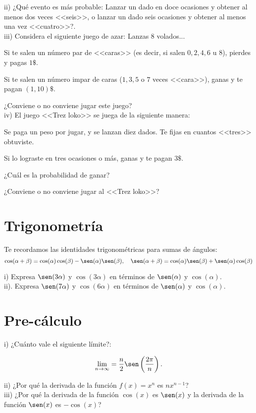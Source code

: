 
ii) ¿Qué evento es más probable: 
Lanzar un dado en doce ocasiones y obtener al menos dos veces <<seis>>, o lanzar un dado seis ocasiones y obtener al menos una vez <<cuatro>>?.\\

iii) Considera el siguiente juego de azar: Lanzas 8 volados...

Si te salen un número par de <<caras>> (es decir, si salen $0,2,4,6$ u $8$), pierdes y pagas $1\$ $. 

Si te salen un número impar de caras ($1,3,5$ o $7$ veces <<cara>>), ganas y te pagan $(1,10)\$ $. 

¿Conviene o no conviene jugar este juego?\\

iv) El juego <<Trez loko>> se juega de la siguiente manera:

Se paga un peso por jugar, y se lanzan diez dados. Te fijas en cuantos <<tres>> obtuviste.

Si lo lograste en tres ocasiones o más, ganas y te pagan $3\$$.

¿Cuál es la probabilidad de ganar?

¿Conviene o no conviene jugar al <<Trez loko>>?

\section*{Trigonometría}

Te recordamos las identidades trigonométricas para sumas de ángulos:
$$\cos(\alpha+\beta)=\cos(\alpha)\cos(\beta)-\sen(\alpha)\sen(\beta), \quad \sen(\alpha+\beta)=\cos(\alpha)\sen(\beta)+\sen(\alpha)\cos(\beta)$$

i) Expresa $\sen(3\alpha)$ y $\cos(3\alpha)$ en términos de $\sen(\alpha)$ y $\cos(\alpha)$.\\

ii). Expresa $\sen(7\alpha)$ y $\cos(6\alpha)$ en términos de $\sen(\alpha)$ y $\cos(\alpha)$.


\section*{Pre-cálculo}

i) ¿Cuánto vale el siguiente límite?:

$$\lim_{n\to\infty}=\frac{n}{2}\sen\left(\frac{2 \pi}{n} \right).$$


ii) ¿Por qué la derivada de la función $f(x)=x^n$ es $nx^{n-1}$?\\


iii) ¿Por qué la derivada de la función $\cos(x)$ es $\sen(x)$ y la derivada de la función $\sen(x)$ es $-\cos(x)$?

